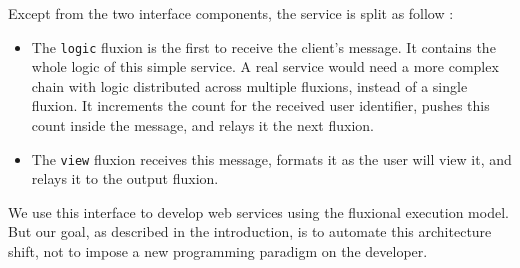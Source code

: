 Except from the two interface components, the service is split as follow :
\begin{itemize}
  \item The \texttt{logic} fluxion is the first to receive the client's message.
  It contains the whole logic of this simple service.
  A real service would need a more complex chain with logic distributed across multiple fluxions, instead of a single fluxion.
  It increments the count for the received user identifier, pushes this count inside the message, and relays it the next fluxion.
  \item The \texttt{view} fluxion receives this message, formats it as the user will view it, and relays it to the output fluxion.
\end{itemize}

We use this interface to develop web services using the fluxional execution model.
But our goal, as described in the introduction, is to automate this architecture shift, not to impose a new programming paradigm on the developer.


